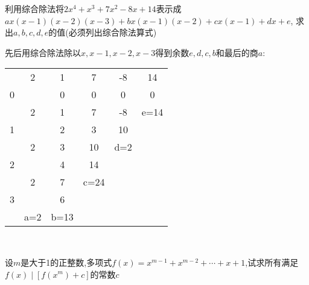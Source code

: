 \begin{example}
    利用综合除法将$2x^4+x^3+7x^2-8x+14$表示成$ax(x-1)(x-2)(x-3)+bx(x-1)(x-2)+cx(x-1)+dx+e$,
    求出$a,b,c,d,e$的值(必须列出综合除法算式)
\end{example}

\begin{solution}
    先后用综合除法除以$x,x-1,x-2,x-3$得到余数$e,d,c,b$和最后的商$a$:
\end{solution}

\begin{table*}[htbp]
    \centering
    \renewcommand{\arraystretch}{1.5}
    \begin{tabular}{c|ccccc}
        & 2 & 1 & 7 & -8 & 14\\ 
        0 & & 0 & 0 & 0 & 0 \\ 
        \hline 
        & 2 & 1 & 7 & -8 & e=14 \\
        1 & & 2 & 3 & 10 & \\ 
        \hline
        & 2 & 3 & 10 & d=2 & \\ 
        2 & & 4 & 14 &  \\ 
        \hline 
        & 2 & 7 & c=24 \\ 
        3 & & 6 & \\ 
        \hline
        & a=2 & b=13 & 
    \end{tabular}
\end{table*}\

\vspace{-16pt}
\begin{example}
    设$m$是大于1的正整数,多项式$f(x)=x^{m-1}+x^{m-2}+\cdots +x+1$,试求所有满足$f(x)\mid {[f(x^m)+c]}$的常数$c$
\end{example}

